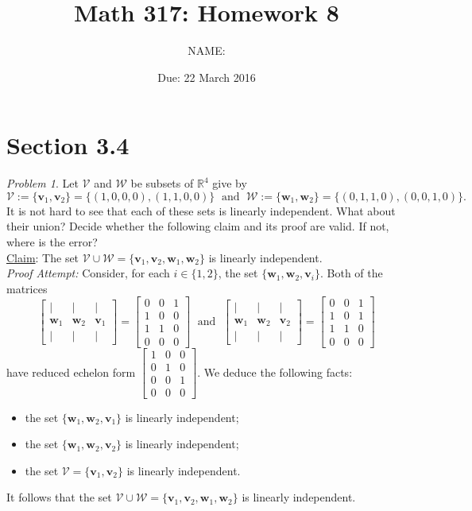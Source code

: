 \documentclass[fleqn,11pt]{paper}
\author         {NAME:                     }
\title{Math 317: Homework 8}
\date{Due: 22 March 2016}
\theoremstyle{remark}
\newtheorem{problem}{Problem}
\newcommand\R{\fld{R}}
\renewcommand{\vec}[1]{\mathbf{#1}}
\newcommand{\<}{\ensuremath{\langle}}
\renewcommand{\>}{\ensuremath{\rangle}}
\newcommand\fld[1]{\ensuremath{\mathbb{#1}}}
\newcommand\vv{\vec{v}}
\newcommand\vw{\vec{w}}
\newcommand\sV{\ensuremath{\mathcal V}}
\newcommand\sW{\ensuremath{\mathcal W}}
\begin{document}
\maketitle
\section*{Section 3.4}
\begin{problem}
Let $\sV$ and $\sW$ be subsets of $\R^4$ give by
\[
\sV :=\{\vv_1, \vv_2\} = \{(1,0,0,0), (1,1,0,0)\} \; \text{ and } \;
\sW := \{\vw_1, \vw_2\} =\{(0,1,1,0), (0,0,1,0)\}.
\]
It is not hard to see that each of these sets is linearly independent.  What about their union?
Decide whether the following claim and its proof are valid.  If not, where is the error?
\\[5pt]
\underline{Claim}: The set $\sV \cup \sW = \{\vv_1, \vv_2, \vw_1, \vw_2\}$ is linearly independent. \\[4pt]
{\it Proof Attempt:} Consider, for each $i\in \{1, 2\}$, the set $\{\vw_1, \vw_2, \vv_i\}$.
Both of the matrices
\[
\begin{bmatrix*}
    | & | & |\\
    \vw_1& \vw_2 & \vv_1\\
    | & | & |
  \end{bmatrix*}=
  \begin{bmatrix*}
    0  & 0 & 1\\
    1  & 0 & 0\\
    1  & 1 & 0\\
    0  & 0 & 0
  \end{bmatrix*}
\; \text{ and } \;
\begin{bmatrix*}
    | & | & |\\
    \vw_1& \vw_2 & \vv_2\\
    | & | & |
  \end{bmatrix*}=
  \begin{bmatrix*}
    0  & 0 & 1\\
    1  & 0 & 1\\
    1  & 1 & 0\\
    0  & 0 & 0
  \end{bmatrix*}\]
  have reduced echelon form
  $\begin{bmatrix*}
    1  & 0 & 0\\
    0  & 1 & 0\\
    0  & 0 & 1\\
    0  & 0 & 0
  \end{bmatrix*}$.
We deduce the following facts:
\begin{itemize}
\item the set $\{\vw_1, \vw_2, \vv_1\}$ is linearly independent;
\item the set $\{\vw_1, \vw_2, \vv_2\}$ is linearly independent;
\item the set $\sV = \{\vv_1, \vv_2\}$ is linearly independent.
\end{itemize}
It follows that the set $\sV \cup \sW = \{\vv_1, \vv_2, \vw_1, \vw_2\}$ is linearly independent. 
\end{problem}
\end{document}

